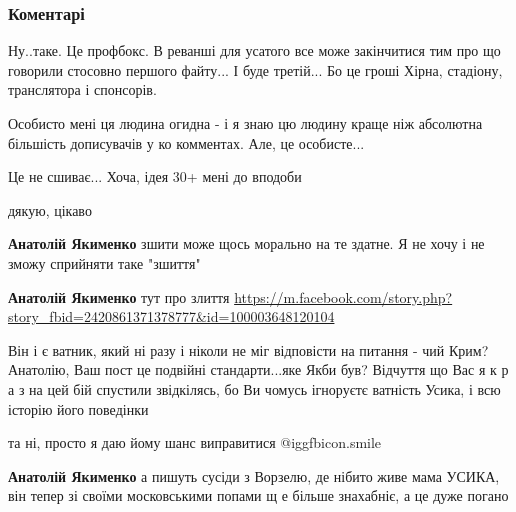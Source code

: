 
 
 
 
 
\subsubsection{Коментарі}
\label{sec:26_09_2021.fb.jakimenko_anatolij.1.usik_bolet_ili_ne_bolet.cmt}

\begin{itemize} %

Ну..таке. Це профбокс. В реванші для усатого все може закінчитися тим про що
говорили стосовно першого файту... І буде третій... Бо це гроші Хірна,
стадіону, транслятора і спонсорів.

Особисто мені ця людина огидна - і я знаю цю людину краще ніж абсолютна
більшість дописувачів у ко комментах. Але, це особисте...

Це не сшиває... Хоча, ідея 30+ мені до вподоби

\begin{itemize} %
дякую, цікаво

\textbf{Анатолій Якименко} зшити може щось морально на те здатне. Я не хочу і не зможу сприйняти таке "зшиття"

\textbf{Анатолій Якименко} тут про злиття
\url{https://m.facebook.com/story.php?story_fbid=2420861371378777&id=100003648120104}
\end{itemize} %


Він і є ватник, який ні разу і ніколи не міг відповісти на питання - чий Крим?
Анатолію, Ваш пост це подвійні стандарти...яке Якби був? Відчуття що Вас я к р
а з на цей бій спустили звідкілясь, бо Ви чомусь ігноруєтє ватність Усика, і
всю історію його поведінки

\begin{itemize} %
та ні, просто я даю йому шанс виправитися  @igg{fbicon.smile} 

\textbf{Анатолій Якименко} а пишуть сусіди з Ворзелю, де нібито живе мама
УСИКА, він тепер зі своїми московськими попами щ е більше знахабніє, а це дуже погано


\end{itemize}
\end{itemize}
